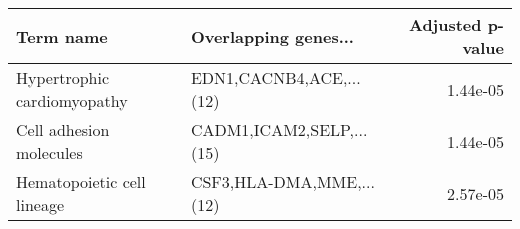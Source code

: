 \begin{tabular}{llr}
\toprule
                  Term name &     Overlapping genes... &  Adjusted p-value \\
\midrule
Hypertrophic cardiomyopathy &  EDN1,CACNB4,ACE,...(12) &          1.44e-05 \\
    Cell adhesion molecules & CADM1,ICAM2,SELP,...(15) &          1.44e-05 \\
 Hematopoietic cell lineage & CSF3,HLA-DMA,MME,...(12) &          2.57e-05 \\
\bottomrule
\end{tabular}
